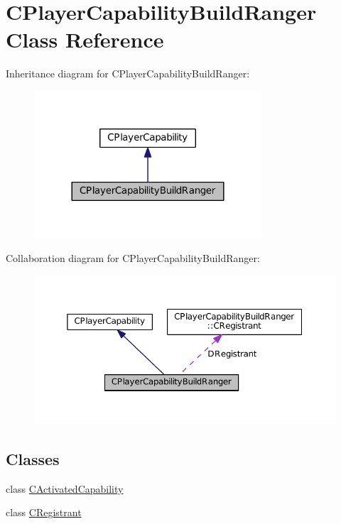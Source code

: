 \hypertarget{classCPlayerCapabilityBuildRanger}{}\section{C\+Player\+Capability\+Build\+Ranger Class Reference}
\label{classCPlayerCapabilityBuildRanger}


Inheritance diagram for C\+Player\+Capability\+Build\+Ranger\+:\nopagebreak
\begin{figure}[H]
\begin{center}
\leavevmode
\includegraphics[width=240pt]{classCPlayerCapabilityBuildRanger__inherit__graph}
\end{center}
\end{figure}


Collaboration diagram for C\+Player\+Capability\+Build\+Ranger\+:\nopagebreak
\begin{figure}[H]
\begin{center}
\leavevmode
\includegraphics[width=350pt]{classCPlayerCapabilityBuildRanger__coll__graph}
\end{center}
\end{figure}
\subsection*{Classes}
\begin{DoxyCompactItemize}
\item 
class \hyperlink{classCPlayerCapabilityBuildRanger_1_1CActivatedCapability}{C\+Activated\+Capability}
\item 
class \hyperlink{classCPlayerCapabilityBuildRanger_1_1CRegistrant}{C\+Registrant}
\end{DoxyCompactItemize}
